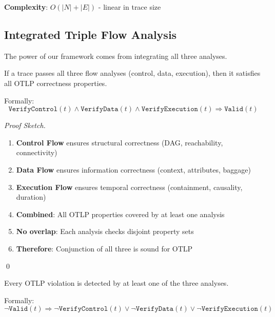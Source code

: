 \textbf{Complexity}: $O(|N| + |E|)$ - linear in trace size

\subsection{Integrated Triple Flow Analysis}
\label{sec:integrated-analysis}

The power of our framework comes from integrating all three analyses.

\begin{theorem}
\label{thm:triple-flow-soundness}
If a trace passes all three flow analyses (control, data, execution), then it satisfies all OTLP correctness properties.

Formally: 
\[
\texttt{VerifyControl}(t) \land \texttt{VerifyData}(t) \land \texttt{VerifyExecution}(t) \Rightarrow \texttt{Valid}(t)
\]
\end{theorem}

\begin{proof}[Proof Sketch]
\begin{enumerate}
\item \textbf{Control Flow} ensures structural correctness (DAG, reachability, connectivity)
\item \textbf{Data Flow} ensures information correctness (context, attributes, baggage)
\item \textbf{Execution Flow} ensures temporal correctness (containment, causality, duration)
\item \textbf{Combined}: All OTLP properties covered by at least one analysis
\item \textbf{No overlap}: Each analysis checks disjoint property sets
\item \textbf{Therefore}: Conjunction of all three is sound for OTLP
\end{enumerate}
\qed
\end{proof}

\begin{theorem}
\label{thm:triple-flow-completeness}
Every OTLP violation is detected by at least one of the three analyses.

Formally: 
\[
\neg\texttt{Valid}(t) \Rightarrow \neg\texttt{VerifyControl}(t) \lor \neg\texttt{VerifyData}(t) \lor \neg\texttt{VerifyExecution}(t)
\]
\end{theorem}

